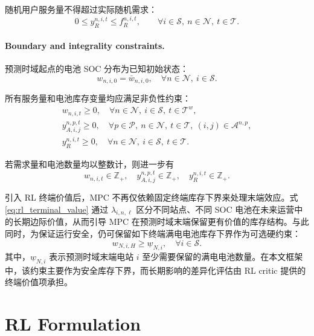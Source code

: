 \documentclass[12pt,hyperref,a4paper,UTF8]{ctexart}
\begin{document}
随机用户服务量不得超过实际随机需求：
\begin{equation}
0\le y_R^{n,i,t}\le f_R^{n,i,t},
\qquad
\forall i\in \mathcal{S},\ n\in \mathcal{N},\ t\in \mathcal{T}.
\label{eq:random_bound}
\end{equation}

\paragraph{Boundary and integrality constraints.}
预测时域起点的电池 SOC 分布为已知初始状态：
\begin{equation}
w_{n,i,0}=\bar{w}_{n,i,0},
\quad \forall n\in \mathcal{N},\ i\in \mathcal{S}.
\label{eq:initial_inventory}
\end{equation}

所有服务量和电池库存变量均应满足非负性约束：
\begin{gather}
w_{n,i,t}\ge 0,
\quad \forall n\in \mathcal{N},\ i\in \mathcal{S},\ t\in \mathcal{T}^{w},
\label{eq:nonnegative_w}\\
y_{A,i,j}^{n,p,t}\ge 0,
\quad \forall p\in \mathcal{P},\ n\in \mathcal{N},\ t\in \mathcal{T},\ (i,j)\in \mathcal{A}^{n,p},
\label{eq:nonnegative_a}\\
y_R^{n,i,t}\ge 0,
\quad \forall n\in \mathcal{N},\ i\in \mathcal{S},\ t\in \mathcal{T}.
\label{eq:nonnegative_r}
\end{gather}

若需求量和电池数量均以整数计，则进一步有
\begin{equation}
w_{n,i,t}\in \mathbb{Z}_{+},\quad
 y_{A,i,j}^{n,p,t}\in \mathbb{Z}_{+},\quad
 y_R^{n,i,t}\in \mathbb{Z}_{+}.
\label{eq:integer}
\end{equation}

引入 RL 终端价值后，MPC 不再仅依赖固定终端库存下界来处理末端效应。式\eqref{eq:rl_terminal_value} 通过 $\lambda_{i,n,\ell}$ 区分不同站点、不同 SOC 电池在未来运营中的长期边际价值，从而引导 MPC 在预测时域末端保留更有价值的库存结构。与此同时，为保证运行安全，仍可保留如下终端满电电池库存下界作为可选硬约束：
\begin{equation}
w_{N,i,H}\ge \underline{w}_{N,i},
\quad \forall i\in \mathcal{S}.
\label{eq:terminal_inventory}
\end{equation}
其中，$\underline{w}_{N,i}$ 表示预测时域末端电站 $i$ 至少需要保留的满电电池数量。在本文框架中，该约束主要作为安全库存下界，而长期影响的差异化评估由 RL critic 提供的终端价值项承担。

\section{RL Formulation}
\end{document}
